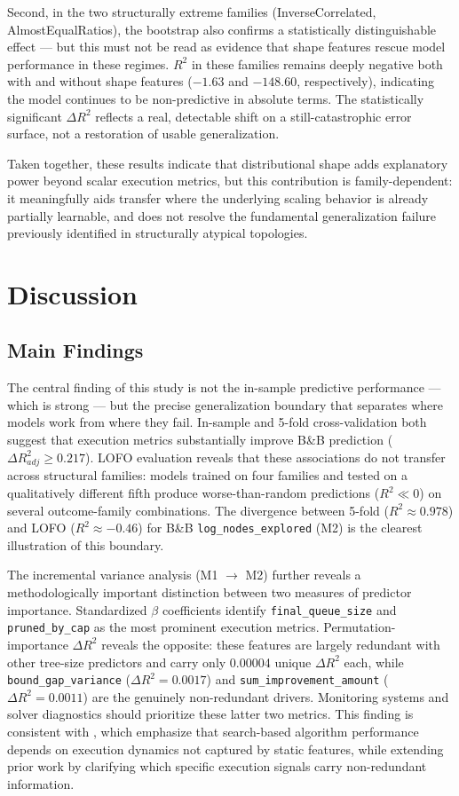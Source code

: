 \documentclass[sigconf]{acmart}
\begin{document}
Second, in the two structurally extreme families (InverseCorrelated, AlmostEqualRatios), the bootstrap also confirms a statistically distinguishable effect --- but this must not be read as evidence that shape features rescue model performance in these regimes. $R^2$ in these families remains deeply negative both with and without shape features ($-1.63$ and $-148.60$, respectively), indicating the model continues to be non-predictive in absolute terms. The statistically significant $\Delta R^2$ reflects a real, detectable shift on a still-catastrophic error surface, not a restoration of usable generalization.

Taken together, these results indicate that distributional shape adds explanatory power beyond scalar execution metrics, but this contribution is family-dependent: it meaningfully aids transfer where the underlying scaling behavior is already partially learnable, and does not resolve the fundamental generalization failure previously identified in structurally atypical topologies.

\section{Discussion}

\subsection{Main Findings}
The central finding of this study is not the in-sample predictive performance --- which is strong --- but the precise generalization boundary that separates where models work from where they fail. In-sample and 5-fold cross-validation both suggest that execution metrics substantially improve B\&B prediction ($\Delta R^2_{adj} \ge 0.217$). LOFO evaluation reveals that these associations do not transfer across structural families: models trained on four families and tested on a qualitatively different fifth produce worse-than-random predictions ($R^2 \ll 0$) on several outcome-family combinations. The divergence between 5-fold ($R^2 \approx 0.978$) and LOFO ($R^2 \approx -0.46$) for B\&B \texttt{log\_nodes\_explored} (M2) is the clearest illustration of this boundary.

The incremental variance analysis (M1 $\rightarrow$ M2) further reveals a methodologically important distinction between two measures of predictor importance. Standardized $\beta$ coefficients identify \texttt{final\_queue\_size} and \texttt{pruned\_by\_cap} as the most prominent execution metrics. Permutation-importance $\Delta R^2$ reveals the opposite: these features are largely redundant with other tree-size predictors and carry only 0.00004 unique $\Delta R^2$ each, while \texttt{bound\_gap\_variance} ($\Delta R^2 = 0.0017$) and \texttt{sum\_improvement\_amount} ($\Delta R^2 = 0.0011$) are the genuinely non-redundant drivers. Monitoring systems and solver diagnostics should prioritize these latter two metrics. This finding is consistent with \cite{LeytonBrown2014}, which emphasize that search-based algorithm performance depends on execution dynamics not captured by static features, while extending prior work by clarifying which specific execution signals carry non-redundant information.
\end{document}
